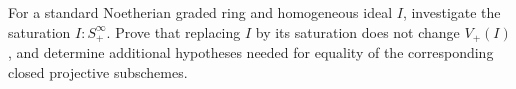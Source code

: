 \begin{problem}\label{chal:vi35-01}
For a standard Noetherian graded ring and homogeneous ideal \(I\), investigate the saturation \(I:S_+^\infty\). Prove that replacing \(I\) by its saturation does not change \(V_+(I)\), and determine additional hypotheses needed for equality of the corresponding closed projective subschemes.
\end{problem}
